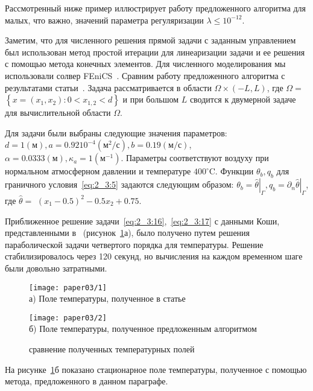 Рассмотренный ниже пример иллюстрирует работу предложенного
алгоритма для малых, что важно, значений параметра регуляризации
$\lambda \leq 10^{-12}$.


Заметим, что для численного решения прямой задачи с заданным управлением
был использован метод простой итерации для линеаризации задачи и ее решения
с помощью метода конечных элементов.
Для численного моделирования мы использовали солвер FEniCS~\cite{fenics, dolfin}.
Сравним работу предложенного
алгоритма с результатами статьи~\cite{Chebotarev2019Problem}.
Задача рассматривается в области $\Omega \times(-L, L)$,
где $\Omega=$ $\left\{x=\left(x_{1}, x_{2}\right): 0<x_{1,2}<d\right\}$
и при большом $L$ сводится к двумерной задаче для вычислительной
области $\Omega$.

Для задачи были выбраны следующие значения параметров:
$d=1(\text{м}), a=0.9210^{-4}(\text{м}^{2} / \text{с}),
b=0.19(\text{м} / \text{с})$, $\alpha=0.0333(\text{м}),
\kappa_{a}=1\left(\text{м}^{-1}\right)$.
Параметры соответствуют воздуху при нормальном атмосферном давлении
и температуре $400^{\circ} \text{C}$.
Функции $\theta_{b}, q_{b}$ для граничного условия~\eqref{eq:2_3:5}
задаются следующим образом: $\theta_{b}=\left.\widehat{\theta}\right|_{\Gamma},
q_{b}=\left.\partial_{n} \widehat{\theta}\right|_{\Gamma}$,
где $\widehat{\theta}=$ $\left(x_{1}-0.5\right)^{2}-0.5 x_{2}+0.75$.

Приближенное решение задачи~\eqref{eq:2_3:16},~\eqref{eq:2_3:17}
с данными Коши, представленными в~\cite{Chebotarev2019Problem}
(рисунок~\ref{fig:4_3:1}а), было получено путем решения параболической задачи
четвертого порядка для температуры.
Решение стабилизировалось через 120 секунд, но
вычисления на каждом временном шаге были
довольно затратными.
\begin{figure}[h!t]
    \begin{minipage}[b][][b]{0.49\linewidth}
        \centering
        \texttt{[image: paper03/1]} \\ а) Поле температуры,
        полученное в статье~\cite{Chebotarev2019Problem}
    \end{minipage}
    \hfill
    \begin{minipage}[b][][b]{0.49\linewidth}
        \centering
        \texttt{[image: paper03/2]} \\
        б) Поле температуры, полученное предложенным алгоритмом
    \end{minipage}
    \caption{сравнение полученных температурных полей}
    \label{fig:4_3:1}
\end{figure}
На рисунке~\ref{fig:4_3:1}б показано стационарное поле температуры,
полученное с помощью метода, предложенного в данном параграфе.

